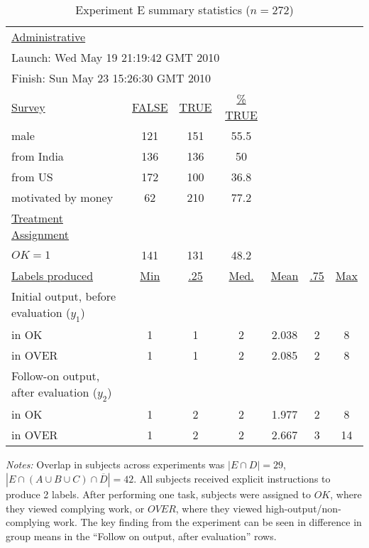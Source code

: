 \documentclass[12pt]{article}
\begin{document}
 
 \begin{table}[h!]
  \begin{center}
   \caption{Experiment E summary statistics ($n=272$)\label{tab:ExpE.ss}}
\begin{tabular}{lcccccc}
  \toprule 
 \underline{Administrative} \\
  \multicolumn{4}{l}{\hspace{10pt} Launch:  Wed May 19 21:19:42 GMT 2010 } \\
  \multicolumn{4}{l}{\hspace{10pt} Finish:   Sun May 23 15:26:30 GMT 2010} \\[5pt]   
  \underline{Survey}    & \underline{FALSE} & \underline{TRUE} & \underline{\% TRUE}   \\
  \hspace{10pt} male                  & 121 & 151 & 55.5  \\
  \hspace{10pt} from India                 & 136 & 136 & 50  \\
  \hspace{10pt} from US                    & 172 & 100 & 36.8  \\
  \hspace{10pt} motivated by money                 & 62 & 210 & 77.2  \\[5pt]
  \underline{Treatment Assignment} \\ 
  \hspace{10pt} $OK=1$ & 141 & 131 & 48.2 \\[5pt]
  
  \underline{Labels produced} &  \underline{Min} & \underline{.25} & \underline{Med.} & \underline{Mean} & \underline{.75} & \underline{Max}\\ 
  Initial output, before evaluation ($y_1$) \\
  \hspace{10pt} in OK     & 1 & 1 & 2 & 2.038 & 2 & 8  \\
  \hspace{10pt} in OVER      & 1 & 1 & 2 & 2.085 & 2 & 8  \\
  Follow-on output, after evaluation ($y_2$) \\
  \hspace{10pt} in OK           & 1 & 2 & 2 & 1.977 & 2 & 8\\
  \hspace{10pt} in OVER            & 1 & 2 & 2 & 2.667 & 3 & 14\\
  
  \bottomrule 
  \end{tabular}
\end{center} 
\emph{Notes:} Overlap in subjects across experiments was $|E \cap
D|=29$, $|E \cap (A \cup B \cup C) \cap \overline{D}|=42$. All
subjects received explicit instructions to produce 2 labels. After
performing one task, subjects were assigned to $OK$, where they viewed
complying work, or $OVER$, where they viewed high-output/non-complying
work. The key finding from the experiment can be seen in difference in
group means in the ``Follow on output, after evaluation'' rows. 
\end{table} 
\end{document}
